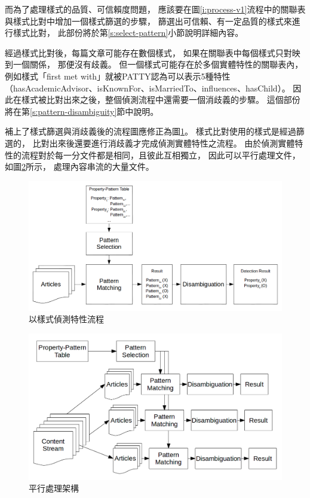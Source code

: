 而為了處理樣式的品質、可信賴度問題，
應該要在圖\ref{i:process-v1}流程中的關聯表與樣式比對中增加一個樣式篩選的步驟，
篩選出可信賴、有一定品質的樣式來進行樣式比對，
此部份將於第\ref{s:select-pattern}小節說明詳細內容。

經過樣式比對後，每篇文章可能存在數個樣式，
如果在關聯表中每個樣式只對映到一個關係，
那便沒有歧義。
但一個樣式可能存在於多個實體特性的關聯表內，
例如樣式「first met with」就被PATTY認為可以表示5種特性（hasAcademicAdvisor、isKnownFor、isMarriedTo、influences、hasChild）。
因此在樣式被比對出來之後，整個偵測流程中還需要一個消歧義的步驟。
這個部份將在第\ref{s:pattern-disambiguity}節中說明。

補上了樣式篩選與消歧義後的流程圖應修正為圖\ref{i:process-v2}。
樣式比對使用的樣式是經過篩選的，
比對出來後還要進行消歧義才完成偵測實體特性之流程。
由於偵測實體特性的流程對於每一分文件都是相同，且彼此互相獨立，
因此可以平行處理文件，如圖\ref{i:process-parallel}所示，
處理內容串流的大量文件。

\begin{figure}
    \centering
    \includegraphics[width=1\textwidth]{images/03-process-v2}
    \caption{以樣式偵測特性流程}
    \label{i:process-v2}
\end{figure}

\begin{figure}
    \centering
    \includegraphics[width=1\textwidth]{images/03-pattern-parallel}
    \caption{平行處理架構}
    \label{i:process-parallel}
\end{figure}


